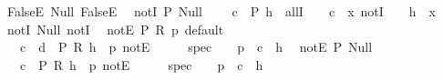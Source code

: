 \begin{isabellebody}
\isanewline
\ \ FalseE{\isacharcolon}{\kern0pt}\ {\isachardoublequoteopen}Null{\isachardoublequoteclose}\ {\isachardoublequoteopen}FalseE{\isachardoublequoteclose}\isanewline
\isanewline
\ \ notI\ {\isacharparenleft}{\kern0pt}P{\isacharparenright}{\kern0pt}{\isacharcolon}{\kern0pt}\ {\isachardoublequoteopen}Null{\isachardoublequoteclose}\isanewline
\ \ \ \ {\isachardoublequoteopen}\isactrlbold {\isasymlambda}{\isacharparenleft}{\kern0pt}c{\isacharcolon}{\kern0pt}\ {\isacharunderscore}{\kern0pt}{\isacharparenright}{\kern0pt}\ P\ {\isacharparenleft}{\kern0pt}h{\isacharcolon}{\kern0pt}\ {\isacharunderscore}{\kern0pt}{\isacharparenright}{\kern0pt}{\isachardot}{\kern0pt}\ allI\ {\isasymcdot}\ {\isacharunderscore}{\kern0pt}\ {\isasymbullet}\ c\ {\isasymbullet}\ {\isacharparenleft}{\kern0pt}\isactrlbold {\isasymlambda}x{\isachardot}{\kern0pt}\ notI\ {\isasymcdot}\ {\isacharunderscore}{\kern0pt}\ {\isasymbullet}\ {\isacharparenleft}{\kern0pt}h\ {\isasymcdot}\ x{\isacharparenright}{\kern0pt}{\isacharparenright}{\kern0pt}{\isachardoublequoteclose}\isanewline
\isanewline
\ \ notI{\isacharcolon}{\kern0pt}\ {\isachardoublequoteopen}Null{\isachardoublequoteclose}\ {\isachardoublequoteopen}notI{\isachardoublequoteclose}\isanewline
\isanewline
\ \ notE\ {\isacharparenleft}{\kern0pt}P{\isacharcomma}{\kern0pt}\ R{\isacharparenright}{\kern0pt}{\isacharcolon}{\kern0pt}\ {\isachardoublequoteopen}{\isasymlambda}p{\isachardot}{\kern0pt}\ default{\isachardoublequoteclose}\isanewline
\ \ \ \ {\isachardoublequoteopen}\isactrlbold {\isasymlambda}{\isacharparenleft}{\kern0pt}c{\isacharcolon}{\kern0pt}\ {\isacharunderscore}{\kern0pt}{\isacharparenright}{\kern0pt}\ {\isacharparenleft}{\kern0pt}d{\isacharcolon}{\kern0pt}\ {\isacharunderscore}{\kern0pt}{\isacharparenright}{\kern0pt}\ P\ R\ {\isacharparenleft}{\kern0pt}h{\isacharcolon}{\kern0pt}\ {\isacharunderscore}{\kern0pt}{\isacharparenright}{\kern0pt}\ p{\isachardot}{\kern0pt}\ notE\ {\isasymcdot}\ {\isacharunderscore}{\kern0pt}\ {\isasymcdot}\ {\isacharunderscore}{\kern0pt}\ {\isasymbullet}\ {\isacharparenleft}{\kern0pt}spec\ {\isasymcdot}\ {\isacharunderscore}{\kern0pt}\ {\isasymcdot}\ p\ {\isasymbullet}\ c\ {\isasymbullet}\ h{\isacharparenright}{\kern0pt}{\isachardoublequoteclose}\isanewline
\isanewline
\ \ notE\ {\isacharparenleft}{\kern0pt}P{\isacharparenright}{\kern0pt}{\isacharcolon}{\kern0pt}\ {\isachardoublequoteopen}Null{\isachardoublequoteclose}\isanewline
\ \ \ \ {\isachardoublequoteopen}\isactrlbold {\isasymlambda}{\isacharparenleft}{\kern0pt}c{\isacharcolon}{\kern0pt}\ {\isacharunderscore}{\kern0pt}{\isacharparenright}{\kern0pt}\ P\ R\ {\isacharparenleft}{\kern0pt}h{\isacharcolon}{\kern0pt}\ {\isacharunderscore}{\kern0pt}{\isacharparenright}{\kern0pt}\ p{\isachardot}{\kern0pt}\ notE\ {\isasymcdot}\ {\isacharunderscore}{\kern0pt}\ {\isasymcdot}\ {\isacharunderscore}{\kern0pt}\ {\isasymbullet}\ {\isacharparenleft}{\kern0pt}spec\ {\isasymcdot}\ {\isacharunderscore}{\kern0pt}\ {\isasymcdot}\ p\ {\isasymbullet}\ c\ {\isasymbullet}\ h{\isacharparenright}{\kern0pt}{\isachardoublequoteclose}\isanewline

\end{isabellebody}
